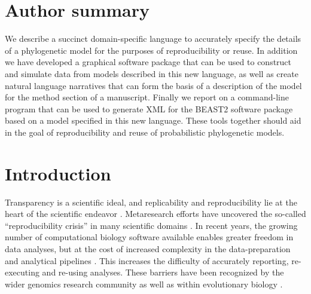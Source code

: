 \documentclass[10pt,letterpaper,table]{article}
\begin{document}
\section*{Author summary}
  We describe a succinct domain-specific language to accurately specify the details of a phylogenetic model for the purposes of reproducibility or reuse.
  In addition we have developed a graphical software package that can be used to construct and simulate data from models described in this new language, as well as create natural language narratives that can form the basis of a description of the model for the method section of a manuscript.
  Finally we report on a command-line program that can be used to generate XML for the BEAST2 software package based on a model specified in this new language.
  These tools together should aid in the goal of reproducibility and reuse of probabilistic phylogenetic models. 


\linenumbers

\section*{Introduction}

Transparency is a scientific ideal, and replicability and
reproducibility lie at the heart of the scientific endeavor
\cite{nas19,munafo17}. 
Metaresearch efforts have uncovered the so-called ``reproducibility
crisis'' \cite{baker16} in many scientific domains \cite{baker16}. 
In recent years, the growing number of computational biology software available enables greater freedom in data analyses, 
but at the cost of increased complexity in the data-preparation and analytical pipelines \cite{eren2021community}. 
This increases the difficulty of accurately reporting, re-executing and re-using analyses. 
These barriers have been recognized by the wider genomics research community \cite{eren2021community} as well as within evolutionary biology \cite{oakley2014osiris}. 
\end{document}
